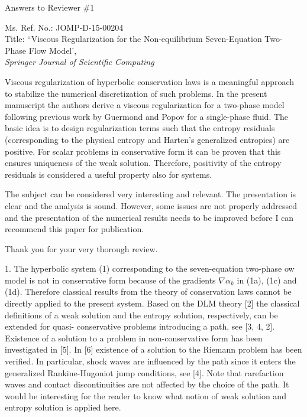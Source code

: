\documentclass{article}
\begin{document}

\begin{center}
{ \Large Answers to Reviewer \#1}
\end{center}

\bigskip

\noindent Ms. Ref. No.: JOMP-D-15-00204\\
Title: ``Viscous Regularization for the Non-equilibrium Seven-Equation Two-Phase Flow Model', \\
{\it Springer Journal of Scientific Computing}\\

\bigskip
\bigskip

{\color{blue}
Viscous regularization of hyperbolic conservation laws is a meaningful approach to stabilize
the numerical discretization of such problems. In the present manuscript the authors derive
a viscous regularization for a two-phase model following previous work by Guermond and
Popov for a single-phase fluid. The basic idea is to design regularization terms such that
the entropy residuals (corresponding to the physical entropy and Harten's generalized
entropies) are positive. For scalar problems in conservative form it can be proven that this
ensures uniqueness of the weak solution. Therefore, positivity of the entropy residuals is
considered a useful property also for systems.

The subject can be considered very interesting and relevant. The presentation is clear
and the analysis is sound. However, some issues are not properly addressed and the
presentation of the numerical results needs to be improved before I can recommend this
paper for publication.}

Thank you for your very thorough review. 
\bigskip


{\color{blue}
1. The hyperbolic system (1) corresponding to the seven-equation two-phase ow model
is not in conservative form because of the gradients $\nabla \alpha_k$ in (1a), (1c) and (1d).
Therefore classical results from the theory of conservation laws cannot be directly
applied to the present system. Based on the DLM theory [2] the classical definitions
of a weak solution and the entropy solution, respectively, can be extended for quasi-
conservative problems introducing a path, see [3, 4, 2]. Existence of a solution to
a problem in non-conservative form has been investigated in [5]. In [6] existence of
a solution to the Riemann problem has been verified. In particular, shock waves
are influenced by the path since it enters the generalized Rankine-Hugoniot jump
conditions, see [4]. Note that rarefaction waves and contact discontinuities are not
affected by the choice of the path. It would be interesting for the reader to know
what notion of weak solution and entropy solution is applied here.}
\end{document}
